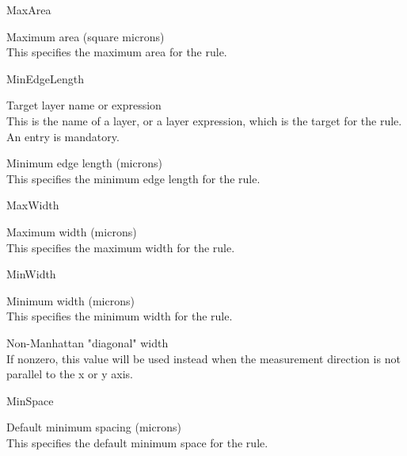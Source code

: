 \begin{description}
\item{\vt MaxArea}\\
\begin{description}
\item{\cb Maximum area (square microns)}\\
This specifies the maximum area for the rule.
\end{description}

\item{\vt MinEdgeLength}\\
\begin{description}
\item{\cb Target layer name or expression}\\
This is the name of a layer, or a layer expression, which is the
target for the rule.  An entry is mandatory.

\item{\cb Minimum edge length (microns)}\\
This specifies the minimum edge length for the rule.
\end{description}

\item{\vt MaxWidth}\\
\begin{description}
\item{\cb Maximum width (microns)}\\
This specifies the maximum width for the rule.
\end{description}

\item{\vt MinWidth}\\
\begin{description}
\item{\cb Minimum width (microns)}\\
This specifies the minimum width for the rule.

\item{\cb Non-Manhattan "diagonal" width}\\
If nonzero, this value will be used instead when the measurement
direction is not parallel to the x or y axis.
\end{description}

\item{\vt MinSpace}\\
\begin{description}
\item{\cb Default minimum spacing (microns)}\\
This specifies the default minimum space for the rule.


\end{description}
\end{description}
